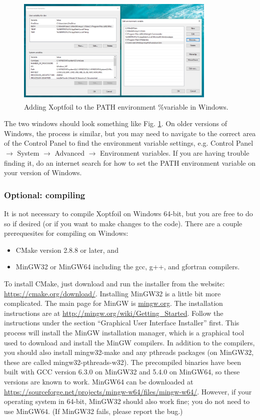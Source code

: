 \documentclass[11pt]{article}
\begin{document}
\begin{figure}
\centering
  \includegraphics[width=0.85\textwidth]{User_Guide_figs/set_path.png}
\caption{Adding Xoptfoil to the PATH environment \%variable in Windows.}
\label{fig:set_path}
\end{figure}

The two windows should look something like Fig. \ref{fig:set_path}.
On older versions of Windows, the process is similar, but you may need to navigate to the
correct area of the Control Panel to find the environment variable settings, e.g. Control
Panel $\rightarrow$ System $\rightarrow$ Advanced $\rightarrow$ Environment variables. If
you are having trouble finding it, do an internet search for how to set the PATH
environment variable on your version of Windows.

\subsubsection{Optional: compiling}

It is not necessary to compile Xoptfoil on Windows 64-bit, but you are free to do so if desired
(or if you want to make changes to the code). There are a couple prerequesites for
compiling on Windows:

\begin{itemize}
  \item{CMake version 2.8.8 or later, and}
  \item{MinGW32 or MinGW64 including the gcc, g++, and gfortran compilers.}
\end{itemize}

To install CMake, just download and run the installer from the website:
\url{https://cmake.org/download/}. Installing MinGW32 is a little bit more complicated.
The main page for
MinGW is \url{mingw.org}. The installation instructions are at
\url{http://mingw.org/wiki/Getting_Started}. Follow the instructions under the section
``Graphical User Interface Installer'' first. This process will install the MinGW
installation manager, which is a graphical tool used to download and install the MinGW
compilers. In addition to the compilers, you should also install mingw32-make and any
pthreads packages (on MinGW32, these are called mingw32-pthreads-w32). The precompiled
binaries have been built with GCC version 6.3.0 on MinGW32 and 5.4.0 on MinGW64, so these
versions are known to work. MinGW64 can be downloaded at
\url{https://sourceforge.net/projects/mingw-w64/files/mingw-w64/}. However, if your
operating system in 64-bit, MinGW32 should also work fine; you do not need to use MinGW64.
(If MinGW32 fails, please report the bug.)
\end{document}
